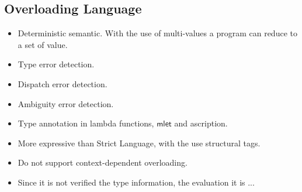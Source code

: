 \documentclass[preprint,authoryear,sort&compress,9pt,nocopyrightspace]{article}
\newcommand{\semanticC}{Strict Language}
\newcommand{\semanticD}{Overloading Language}
\begin{document}
\subsection{\semanticD}
\begin{itemize}
\item Deterministic semantic. With the use of multi-values a program can reduce to a set of value.
\item Type error detection.
\item Dispatch error detection.
\item Ambiguity error detection.
\item Type annotation in lambda functions, $\mathsf{mlet}$ and ascription.
\item More expressive than \semanticC, with the use structural tags.
\item Do not support context-dependent overloading.
\item Since it is not verified the type information, the evaluation  it is ...
\end{itemize}
\end{document}
